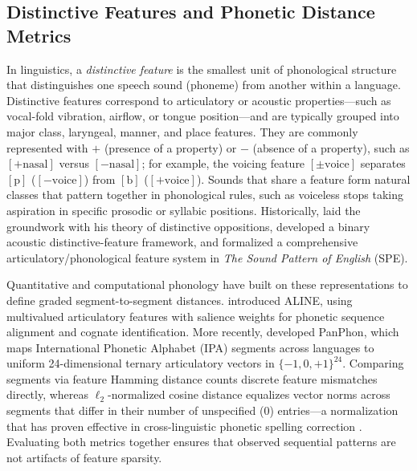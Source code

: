 \documentclass[11pt,a4paper,leqno]{article}
\begin{document}
\subsection{Distinctive Features and Phonetic Distance Metrics}
In linguistics, a \emph{distinctive feature} is the smallest unit of phonological structure that distinguishes one speech sound (phoneme) from another within a language. Distinctive features correspond to articulatory or acoustic properties---such as vocal-fold vibration, airflow, or tongue position---and are typically grouped into major class, laryngeal, manner, and place features. They are commonly represented with $+$ (presence of a property) or $-$ (absence of a property), such as $[+\text{nasal}]$ versus $[-\text{nasal}]$; for example, the voicing feature $[\pm\text{voice}]$ separates $[\text{p}]$ ($[-\text{voice}]$) from $[\text{b}]$ ($[+\text{voice}]$). Sounds that share a feature form natural classes that pattern together in phonological rules, such as voiceless stops taking aspiration in specific prosodic or syllabic positions. Historically, \citet{trubetzkoy1939} laid the groundwork with his theory of distinctive oppositions, \citet{jakobson1952} developed a binary acoustic distinctive-feature framework, and \citet{chomsky1968} formalized a comprehensive articulatory/phonological feature system in \emph{The Sound Pattern of English} (SPE).

Quantitative and computational phonology have built on these representations to define graded segment-to-segment distances. \citet{kondrak2003} introduced ALINE, using multivalued articulatory features with salience weights for phonetic sequence alignment and cognate identification. More recently, \citet{mortensen2016panphon} developed PanPhon, which maps International Phonetic Alphabet (IPA) segments across languages to uniform 24-dimensional ternary articulatory vectors in $\{-1, 0, +1\}^{24}$. Comparing segments via feature Hamming distance counts discrete feature mismatches directly, whereas $\ell_2$-normalized cosine distance equalizes vector norms across segments that differ in their number of unspecified ($0$) entries---a normalization that has proven effective in cross-linguistic phonetic spelling correction \citep{mortensen2016panphon}. Evaluating both metrics together ensures that observed sequential patterns are not artifacts of feature sparsity.
\end{document}
